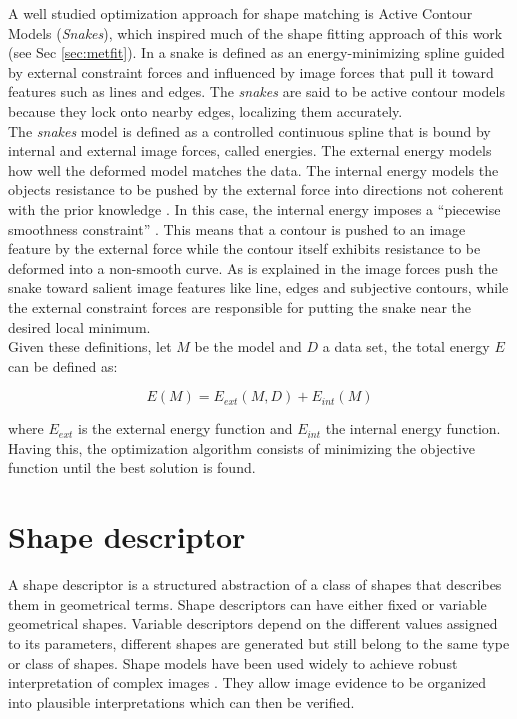 A well studied optimization approach for shape matching is
Active Contour Models (\emph{Snakes}),  which inspired much 
of the shape fitting approach of this work 
(see Sec \ref{sec:metfit}). In \cite{snakes} a snake is defined 
as an energy-minimizing spline guided by external constraint
forces and influenced by image forces that pull it toward 
features such as lines and edges. The \emph{snakes} are said to
be active contour models because they lock onto nearby edges,
localizing them accurately.\\
The \emph{snakes} model is defined as a controlled continuous spline that is bound
by internal and external image forces, called energies. The external energy models how well
the deformed model matches the data. The internal energy models
the objects resistance to be pushed by the external force into directions not coherent
with the prior knowledge \cite{deformable}. In this case, the internal energy  imposes 
a ``piecewise smoothness constraint'' \cite{snakes}. This means that a contour is
pushed to an image feature by the external force while the contour itself exhibits resistance
to be deformed into a non-smooth curve. As is explained in \cite{deformable} the image forces push the snake toward
salient image features like line, edges and subjective contours, while the external constraint forces
are responsible for putting the snake near the desired local minimum.\\

Given these definitions, let $M$ be the model and $D$ a data set, 
the total energy $E$ can be defined as:

$$E(M) = E_{ext}(M,D) + E_{int}(M)$$

where $E_{ext}$ is the external energy function and $E_{int}$ the 
internal energy function. 
Having this, the optimization algorithm consists of minimizing the objective
function until the best solution is found.


\section{Shape descriptor}
\label{sec:shapedesc}

A shape descriptor is a structured abstraction of a class
of shapes that describes them in geometrical terms.
Shape descriptors can have either fixed or variable
geometrical shapes. Variable descriptors depend on the different values assigned to its
parameters, different shapes are generated but still belong to the same type or class of shapes.
Shape models have been used widely to achieve robust interpretation of complex
images \cite{wormparam}. They allow image evidence to be organized into plausible interpretations
which can then be verified.\\

